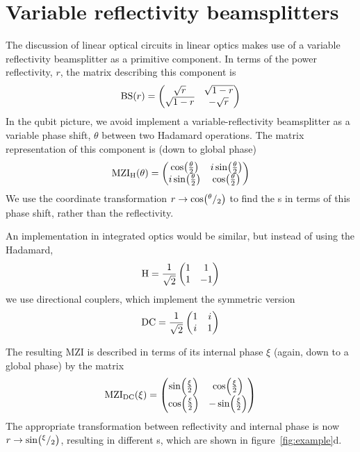 \section{Variable reflectivity beamsplitters}
\label{sec:integrated}

The discussion of linear optical circuits in linear optics makes use of a
variable reflectivity beamsplitter as a primitive component. In terms of the
power reflectivity, \(r\), the matrix describing this component is
\begin{equation}
  \mathrm{BS} \!\left(r\right) = \begin{pmatrix}
    \sqrt{r} & \sqrt{1-r} \\
    \sqrt{1-r} & -\sqrt{r}
  \end{pmatrix}
\end{equation}
In the qubit picture, we avoid implement a variable-reflectivity beamsplitter as
a variable phase shift, \(\theta\) between two Hadamard operations. The matrix
representation of this component is (down to global phase)
\begin{equation}
  \mathrm{MZI}_{\mathrm{H}} \!\left(\theta\right) = \begin{pmatrix}
    \cos \!\left( \frac{\theta}{2} \right) & i \sin \!\left( \frac{\theta}{2} \right) \\
    i \sin \!\left( \frac{\theta}{2} \right) & \cos \!\left( \frac{\theta}{2} \right)
  \end{pmatrix}
\end{equation}
We use the coordinate transformation \( r \rightarrow \cos \!\left( ^{\theta}/_{2}\right)
\) to find the \pdf{}s in terms of this phase shift, rather than the
reflectivity.

An implementation in integrated optics would be similar, but instead of using
the Hadamard,
\begin{equation}
  \mathrm{H} = \frac{1}{\sqrt{2}} \begin{pmatrix}
    1 & 1 \\
    1 & -1
  \end{pmatrix}
\end{equation}
we use directional couplers, which implement the symmetric version
\begin{equation}
  \mathrm{DC} = \frac{1}{\sqrt{2}} \begin{pmatrix}
    1 & i \\
    i & 1
  \end{pmatrix}
\end{equation}

The resulting MZI is described in terms of its internal phase \(\xi\) (again,
down to a global phase) by the matrix
\begin{equation}
  \mathrm{MZI}_{\mathrm{DC}} \!\left(\xi\right) = \begin{pmatrix}
    \sin \!\left( \frac{\xi}{2} \right) & \cos \!\left( \frac{\xi}{2} \right) \\
    \cos \!\left( \frac{\xi}{2} \right) & -\sin \!\left( \frac{\xi}{2} \right)
  \end{pmatrix}
\end{equation}
The appropriate transformation between reflectivity and internal phase is now
\(r \rightarrow \sin \!\left(^{\xi}/_{2}\right) \), resulting in different \pdf{}s, which
are shown in figure~\ref{fig:example}d.

